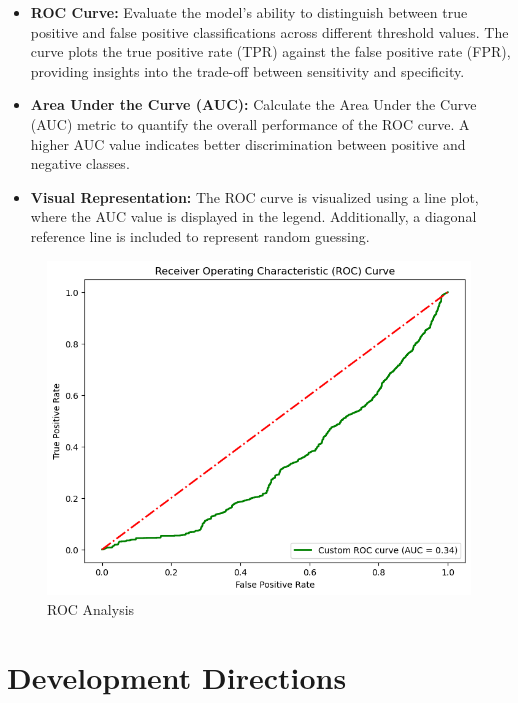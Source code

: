 \begin{itemize}
	\item \textbf{ROC Curve:} Evaluate the model's ability to distinguish between true positive and false positive classifications across different threshold values. The curve plots the true positive rate (TPR) against the false positive rate (FPR), providing insights into the trade-off between sensitivity and specificity.
	
	\item \textbf{Area Under the Curve (AUC):} Calculate the Area Under the Curve (AUC) metric to quantify the overall performance of the ROC curve. A higher AUC value indicates better discrimination between positive and negative classes.
	
	\item \textbf{Visual Representation:} The ROC curve is visualized using a line plot, where the AUC value is displayed in the legend. Additionally, a diagonal reference line is included to represent random guessing.
\end{itemize}

\begin{figure}[H]
	\centering
	\includegraphics[width=0.7\linewidth]{chap4/7}
	\caption{ROC Analysis}
	\label{fig:7}
\end{figure}

\section{Development Directions}

